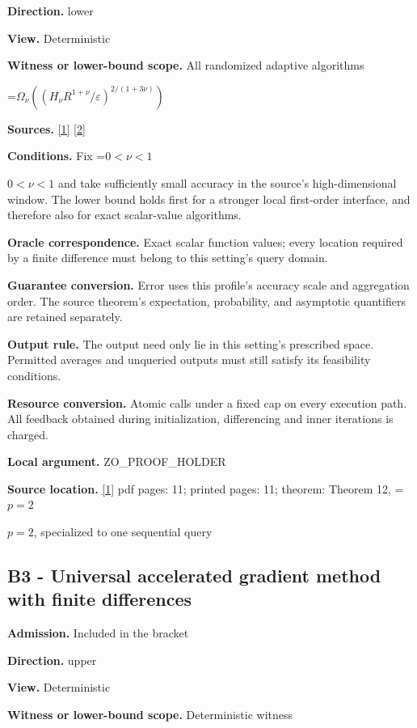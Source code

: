 \documentclass[10pt,a4paper]{article}
\newcommand{\AtlasMath}[1]{\par\begingroup\centering\setbox0=\hbox{$\displaystyle #1$}\ifdim\wd0>1.4\linewidth\typeout{ATLAS WIDE FORMULA: \the\wd0}\fi\ifdim\wd0>\linewidth\resizebox{\linewidth}{!}{\box0}\else\box0\fi\par\endgroup}
\newcommand{\AtlasInlineMath}[1]{\begingroup\setbox0=\hbox{$#1$}\ifdim\wd0>.4\linewidth\endgroup\AtlasMath{#1}\else\endgroup$#1$\fi}
\begin{document}
\textbf{Direction.} lower

\textbf{View.} Deterministic

\textbf{Witness or lower-bound scope.} All randomized adaptive algorithms

\AtlasMath{\Omega_\nu((H_\nu R^{1+\nu}/\varepsilon)^{2/(1+3\nu)})}
\textbf{Sources.} \href{https://proceedings.mlr.press/v99/diakonikolas19c/diakonikolas19c.pdf}{[1]} \href{https://optimization-online.org/wp-content/uploads/2013/04/3833.pdf}{[2]}

\textbf{Conditions.} Fix \AtlasInlineMath{0<\nu<1} and take sufficiently small accuracy in the source's high-dimensional window. The lower bound holds first for a stronger local first-order interface, and therefore also for exact scalar-value algorithms.

\textbf{Oracle correspondence.} Exact scalar function values; every location required by a finite difference must belong to this setting's query domain.

\textbf{Guarantee conversion.} Error uses this profile's accuracy scale and aggregation order. The source theorem's expectation, probability, and asymptotic quantifiers are retained separately.

\textbf{Output rule.} The output need only lie in this setting's prescribed space. Permitted averages and unqueried outputs must still satisfy its feasibility conditions.

\textbf{Resource conversion.} Atomic calls under a fixed cap on every execution path. All feedback obtained during initialization, differencing and inner iterations is charged.

\textbf{Local argument.} ZO\_\allowbreak{}PROOF\_\allowbreak{}HOLDER

\textbf{Source location.} \href{https://proceedings.mlr.press/v99/diakonikolas19c/diakonikolas19c.pdf}{[1]} pdf pages: 11; printed pages: 11; theorem: Theorem 12, \AtlasInlineMath{p=2}, specialized to one sequential query

\subsection{B3 - Universal accelerated gradient method with finite differences}
\textbf{Admission.} Included in the bracket

\textbf{Direction.} upper

\textbf{View.} Deterministic

\textbf{Witness or lower-bound scope.} Deterministic witness
\end{document}
